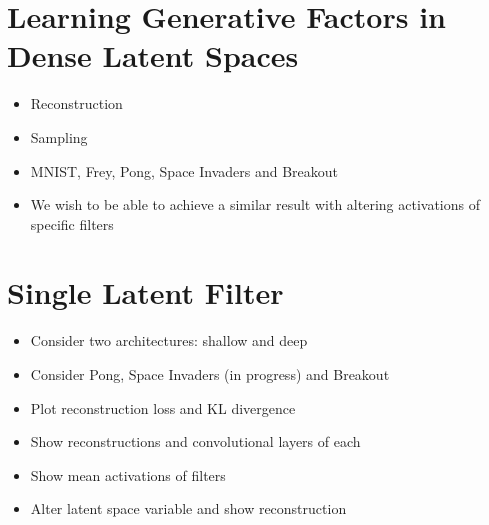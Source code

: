 %
%
%
%
%
\section{Learning Generative Factors in Dense Latent Spaces}

\begin{itemize}
\item Reconstruction 
\item Sampling
\item MNIST, Frey, Pong, Space Invaders and Breakout
\item We wish to be able to achieve a similar result with altering activations of specific filters
\end{itemize}


%
%
%
%
%
\section{Single Latent Filter}

\begin{itemize}
\item Consider two architectures: shallow and deep
\item Consider Pong, Space Invaders (in progress) and Breakout
\item Plot reconstruction loss and KL divergence
\item Show reconstructions and convolutional layers of each
\item Show mean activations of filters
\item Alter latent space variable and show reconstruction
\end{itemize}


